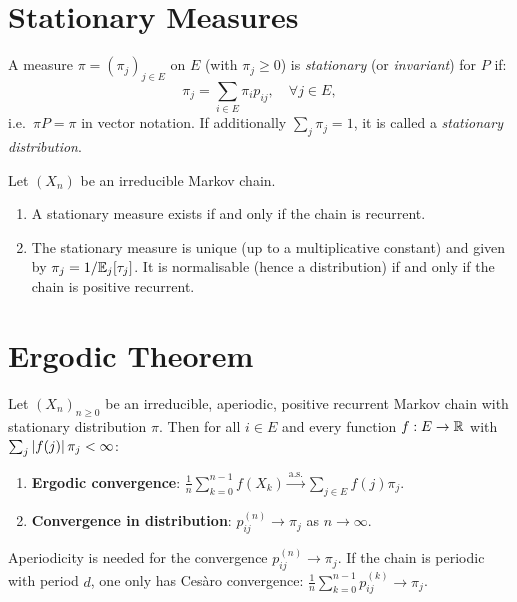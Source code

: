 \section{Stationary Measures}

\begin{definition}
A measure $\pi = (\pi_j)_{j \in E}$ on $E$ (with $\pi_j \geq 0$) is
\emph{stationary} (or \emph{invariant}) for $P$ if:
\[
  \pi_j = \sum_{i \in E} \pi_i p_{ij}, \quad \forall j \in E,
\]
i.e.\ $\pi P = \pi$ in vector notation. If additionally $\sum_j \pi_j = 1$,
it is called a \emph{stationary distribution}.
\end{definition}

\begin{theorem}
\label{thm:stat_uniq}
Let $(X_n)$ be an irreducible Markov chain.
\begin{enumerate}
  \item A stationary measure exists if and only if the chain is recurrent.
  \item The stationary measure is unique (up to a multiplicative constant) and
    given by $\pi_j = 1/\mathbb{E}_j[\tau_j]$. It is normalisable (hence a distribution)
    if and only if the chain is positive recurrent.
\end{enumerate}
\end{theorem}

\section{Ergodic Theorem}

\begin{theorem}
\label{thm:ergodic}
Let $(X_n)_{n \geq 0}$ be an irreducible, aperiodic, positive recurrent Markov
chain with stationary distribution $\pi$. Then for all $i \in E$ and every
function $f : E \to \mathbb{R}$ with $\sum_j \left| f(j) \right| \pi_j < \infty$:
\begin{enumerate}
  \item \textbf{Ergodic convergence}:
    $\displaystyle \frac{1}{n} \sum_{k=0}^{n-1} f(X_k) \xrightarrow{\text{a.s.}}
    \sum_{j \in E} f(j) \pi_j$.
  \item \textbf{Convergence in distribution}: $p_{ij}^{(n)} \to \pi_j$ as $n \to \infty$.
\end{enumerate}
\end{theorem}

\begin{warning}[title=\textbf{Role of Aperiodicity}]
Aperiodicity is needed for the convergence $p_{ij}^{(n)} \to \pi_j$. If the chain
is periodic with period $d$, one only has Ces\`aro convergence:
$\frac{1}{n}\sum_{k=0}^{n-1} p_{ij}^{(k)} \to \pi_j$.
\end{warning}

